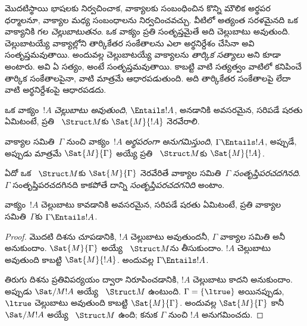\documentclass[../../../include/open-logic-section]{subfiles}
\begin{document}

\begin{explain}
మొదటిస్థాయి భాషలకు  నిర్వచించాక,
వాక్యాలకు సంబంధించిన కొన్ని మౌలిక అర్థపర ధర్మాలనూ, వాక్యాల మధ్య
సంబంధాలను నిర్వచించవచ్చు. వీటిలో అత్యంత సరళమైనది ఒక వాక్యానికి గల
\emph{చెల్లుబాటుతనం}. ఒక వాక్యం ప్రతి 
సంతృప్తమైతే అది చెల్లుబాటు అవుతుంది. చెల్లుబాటయ్యే వాక్యాల్లోని
తార్కికేతర సంకేతాలను ఎలా అర్థనిర్దేశం చేసినా అవి సంతృప్తమవుతాయి.
అందువల్ల చెల్లుబాటయ్యే వాక్యాలను \emph{తార్కిక సత్యాలు} అని కూడా
అంటారు. అవి ఏ  సత్యం, అంటే సంతృప్తమవుతాయి. కాబట్టి
వాటి సత్యత్వం వాటిలో కనిపించే తార్కిక సంకేతాలపైనా, వాటి
 మాత్రమే ఆధారపడుతుంది. అది తార్కికేతర సంకేతాలపై లేదా వాటి
అర్థనిర్దేశంపై ఆధారపడదు.
\end{explain}

\begin{defn}[చెల్లుబాటుతనం]
ఒక వాక్యం~$!A$ \emph{చెల్లుబాటు అవుతుంది}, $\Entails !A$, అనడానికి అవసరమైన, సరిపడే షరతు ఏమిటంటే,
ప్రతి ~$\Struct M$కు $\Sat{M}{!A}$ నెరవేరాలి.
\end{defn}

\begin{defn}
వాక్యాల సమితి~$\Gamma$ నుంచి వాక్యం~$!A$ \emph{అర్థపరంగా
అనుగమిస్తుంది}, $\Gamma \Entails !A$, అప్పుడే, అప్పుడు మాత్రమే
$\Sat{M}{\Gamma}$ అయ్యే ప్రతి ~$\Struct M$కు
$\Sat{M}{!A}$.
\end{defn}


\begin{defn}
ఏదో ఒక ~$\Struct M$కు $\Sat{M}{\Gamma}$ నెరవేరితే వాక్యాల
సమితి~$\Gamma$ \emph{సంతృప్తిపరచదగినది}. $\Gamma$
సంతృప్తిపరచదగినది కాకపోతే దాన్ని \emph{సంతృప్తిపరచదగనిది} అంటాం.
\end{defn}

\begin{prop}
వాక్యం~$!A$ చెల్లుబాటు కావడానికి అవసరమైన, సరిపడే షరతు ఏమిటంటే, ప్రతి
వాక్యాల సమితి~$\Gamma$కు $\Gamma \Entails !A$.
\end{prop}

\begin{proof}
మొదటి దిశను చూపడానికి, $!A$ చెల్లుబాటు అవుతుందనీ, $\Gamma$ వాక్యాల
సమితి అనీ అనుకుందాం. $\Sat{M}{\Gamma}$ అయ్యే
~$\Struct M$ను తీసుకుందాం. $!A$ చెల్లుబాటు అవుతుంది
కాబట్టి $\Sat{M}{!A}$. అందువల్ల $\Gamma \Entails !A$.

తిరుగు దిశను ప్రతివిపర్యయం ద్వారా నిరూపించడానికి, $!A$ చెల్లుబాటు కాదని
అనుకుందాం. అప్పుడు $\Sat/{M}{!A}$ అయ్యే ~$\Struct M$
ఉంటుంది. $\Gamma = \{ \ltrue \}$ అయినప్పుడు, $\ltrue$ చెల్లుబాటు
అవుతుంది కాబట్టి $\Sat{M}{\Gamma}$. అందువల్ల $\Sat{M}{\Gamma}$ కానీ
$\Sat/{M}{!A}$ అయ్యే ~$\Struct M$ ఉంది; కనుక
$\Gamma$ నుంచి $!A$ అనుగమించదు.
\end{proof}
\end{document}
